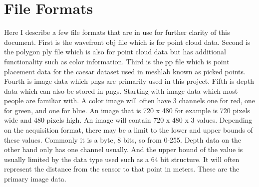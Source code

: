 \section{File Formats}
Here I describe a few file formats that are in use for further clarity of this document. First is the wavefront obj file which is for point cloud data. Second is the polygon ply file which is also for point cloud data but has additional functionality such as color information. Third is the pp file which is point placement data for the caesar dataset used in meshlab known as picked points. Fourth is image data which pngs are primarily used in this project. Fifth is depth data which can also be stored in pngs. Starting with image data which most people are familiar with. A color image will often have 3 channels one for red, one for green, and one for blue. An image that is 720 x 480 for example is 720 pixels wide and 480 pixels high. An image will contain 720 x 480 x 3 values. Depending on the acquisition format, there may be a limit to the lower and upper bounds of these values. Commonly it is a byte, 8 bits, so from 0-255. Depth data on the other hand only has one channel usually. And the upper bound of the value is usually limited by the data type used such as a 64 bit structure. It will often represent the distance from the sensor to that point in meters. These are the primary image data.


